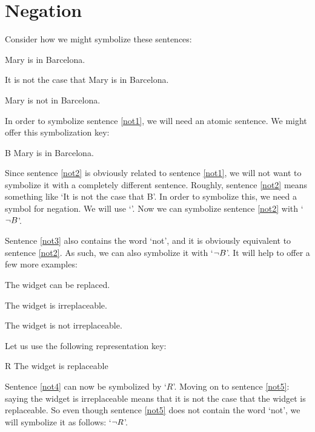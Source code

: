         
\section{Negation}

Consider how we might symbolize these sentences:
	\begin{earg}
	\item[\ex{not1}] Mary is in Barcelona.
	\item[\ex{not2}] It is not the case that Mary is in Barcelona.
	\item[\ex{not3}] Mary is not in Barcelona.
	\end{earg}
In order to symbolize sentence \ref{not1}, we will need an atomic sentence. We might offer this symbolization key:
	\begin{ekey}
		\item[B] Mary is in Barcelona.
	\end{ekey}
Since sentence \ref{not2} is obviously related to  sentence \ref{not1}, we will not want to symbolize it with a completely different sentence. Roughly, sentence \ref{not2} means something like `It is not the case that B'. In order to symbolize this, we need a symbol for negation. We will use `\enot'. Now we can symbolize sentence \ref{not2} with `$\neg B$'.

Sentence \ref{not3} also contains the word `not', and it is obviously equivalent to sentence \ref{not2}. As such, we can also symbolize it with `$\neg B$'.
It will help to offer a few more examples:
	\begin{earg}
		\item[\ex{not4}] The widget can be replaced.
		\item[\ex{not5}] The widget is irreplaceable.
		\item[\ex{not5b}] The widget is not irreplaceable.
	\end{earg}
Let us use the following representation key:
	\begin{ekey}
		\item[R] The widget is replaceable
	\end{ekey}
Sentence \ref{not4} can now be symbolized by `$R$'. Moving on to sentence \ref{not5}: saying the widget is irreplaceable means that it is not the case that the widget is replaceable. So even though sentence \ref{not5} does not contain the word `not', we will symbolize it as follows: `$\neg R$'.

